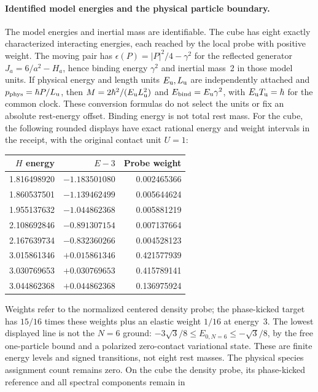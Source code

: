\paragraph{Identified model energies and the physical particle boundary.}
The model energies and inertial mass are identifiable.  The cube has eight
exactly characterized interacting energies, each reached by the local
probe with positive weight.  The moving pair has
$\epsilon(P)=|P|^2/4-\gamma^2$ for the reflected generator
$J_a=6/a^2-H_a$, hence binding energy $\gamma^2$ and
inertial mass~2 in those model units.  If physical energy and length units
$E_{\rm u},L_{\rm u}$ are independently attached and
$p_{\rm phys}=\hbar P/L_{\rm u}$, then
$M=2\hbar^2/(E_{\rm u}L_{\rm u}^2)$ and
$E_{\rm bind}=E_{\rm u}\gamma^2$, with
$E_{\rm u}T_{\rm u}=\hbar$ for the common clock.
These conversion formulas do not select the units or fix an absolute
rest-energy offset.  Binding energy is not total rest mass.
For the cube, the following rounded displays have exact rational
energy and weight intervals in the receipt, with the original contact
unit $U=1$:
\begingroup
\setlength{\tabcolsep}{8pt}
\begin{center}
\begin{tabular}{rrr}
$H$ energy & $E-3$ & Probe weight\\
\hline
1.816498920 & $-1.183501080$ & 0.002465366\\
1.860537501 & $-1.139462499$ & 0.005644624\\
1.955137632 & $-1.044862368$ & 0.005881219\\
2.108692846 & $-0.891307154$ & 0.007137664\\
2.167639734 & $-0.832360266$ & 0.004528123\\
3.015861346 & $+0.015861346$ & 0.421577939\\
3.030769653 & $+0.030769653$ & 0.415789141\\
3.044862368 & $+0.044862368$ & 0.136975924
\end{tabular}
\end{center}
\endgroup
Weights refer to the normalized centered density probe; the phase-kicked
target has $15/16$ times these weights plus an elastic weight $1/16$ at
energy~3.  The lowest displayed line is not the $N=6$ ground:
$-3\sqrt3/8\le E_{0,N=6}\le-\sqrt3/8$, by the free one-particle
bound and a polarized zero-contact variational state.  These are finite
energy levels and signed transitions, not eight rest masses.
The physical species assignment count remains zero.  On the cube the density
probe, its phase-kicked reference and all spectral components remain in
